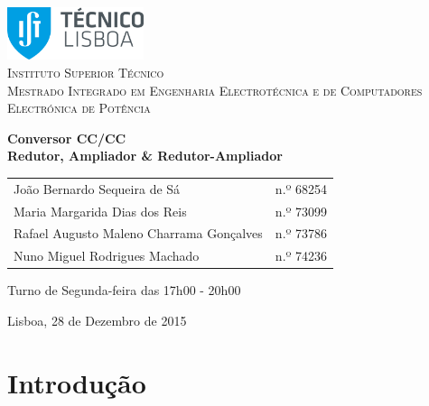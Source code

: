 \documentclass[a4paper,11pt]{article}
\numberwithin{equation}{section}
\begin{document}
\begin{titlepage}
\begin{center}

\hfill \break
\hfill \break

\includegraphics[width=0.3\textwidth]{img/logo}~\\[1cm] 

\textsc{\LARGE Instituto Superior Técnico}\\[0.25cm]
\textsc{\Large Mestrado Integrado em Engenharia Electrotécnica e de Computadores}\\[1.8cm]
\textsc{\huge Electrónica de Potência}\\[0.25cm]

\vspace{6mm}

{\huge \bfseries Conversor CC/CC \\[0.7cm]}
{\bfseries Redutor, Ampliador \& Redutor-Ampliador \\[1cm]}

\begin{tabular}{ l l }
	João Bernardo Sequeira de Sá & \hspace{2mm} n.º 68254 \\
	Maria Margarida Dias dos Reis & \hspace{2mm} n.º 73099 \\
	Rafael Augusto Maleno Charrama Gonçalves & \hspace{2mm} n.º 73786 \\
	Nuno Miguel Rodrigues Machado & \hspace{2mm} n.º 74236
\end{tabular}

\vspace{7mm}

Turno de Segunda-feira das 17h00 - 20h00

\vfill

{\large Lisboa, 28 de Dezembro de 2015} 
	
\end{center}
\end{titlepage}
	
\tableofcontents
\pagebreak

\section{Introdução}
\end{document}
